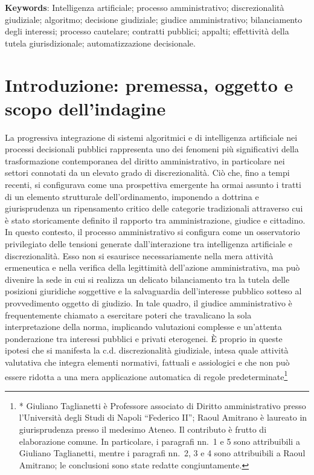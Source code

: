 \documentclass[american,a4paper,]{article}
\begin{document}
\textbf{Keywords}: Intelligenza artificiale; processo amministrativo; discrezionalità giudiziale; algoritmo; decisione giudiziale; giudice amministrativo; bilanciamento degli interessi; processo cautelare; contratti pubblici; appalti; effettività della tutela giurisdizionale; automatizzazione decisionale.

\section{Introduzione: premessa, oggetto e scopo dell'indagine}\label{introduzione-premessa-oggetto-e-scopo-dellindagine}

La progressiva integrazione di sistemi algoritmici e di intelligenza artificiale nei processi decisionali pubblici rappresenta uno dei fenomeni più significativi della trasformazione contemporanea del diritto amministrativo, in particolare nei settori connotati da un elevato grado di discrezionalità. Ciò che, fino a tempi recenti, si configurava come una prospettiva emergente ha ormai assunto i tratti di un elemento strutturale dell'ordinamento, imponendo a dottrina e giurisprudenza un ripensamento critico delle categorie tradizionali attraverso cui è stato storicamente definito il rapporto tra amministrazione, giudice e cittadino. In questo contesto, il processo amministrativo si configura come un osservatorio privilegiato delle tensioni generate dall'interazione tra intelligenza artificiale e discrezionalità. Esso non si esaurisce necessariamente nella mera attività ermeneutica e nella verifica della legittimità dell'azione amministrativa, ma può divenire la sede in cui si realizza un delicato bilanciamento tra la tutela delle posizioni giuridiche soggettive e la salvaguardia dell'interesse pubblico sotteso al provvedimento oggetto di giudizio. In tale quadro, il giudice amministrativo è frequentemente chiamato a esercitare poteri che travalicano la sola interpretazione della norma, implicando valutazioni complesse e un'attenta ponderazione tra interessi pubblici e privati eterogenei. È proprio in queste ipotesi che si manifesta la c.d. discrezionalità giudiziale, intesa quale attività valutativa che integra elementi normativi, fattuali e assiologici e che non può essere ridotta a una mera applicazione automatica di regole predeterminate\footnote{* Giuliano Taglianetti è Professore associato di Diritto amministrativo presso l'Università degli Studi di Napoli ``Federico II''; Raoul Amitrano è laureato in giurisprudenza presso il medesimo Ateneo. Il contributo è frutto di elaborazione comune. In particolare, i paragrafi nn.~1 e 5 sono attribuibili a Giuliano Taglianetti, mentre i paragrafi nn.~2, 3 e 4 sono attribuibili a Raoul Amitrano; le conclusioni sono state redatte congiuntamente.

}
\end{document}
